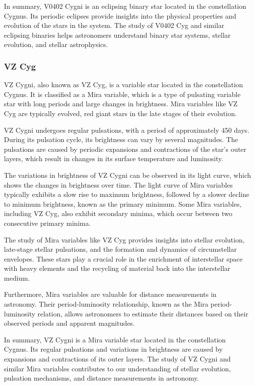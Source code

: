 In summary, V0402 Cygni is an eclipsing binary star located in the constellation Cygnus. Its periodic eclipses provide insights into the physical properties and evolution of the stars in the system. The study of V0402 Cyg and similar eclipsing binaries helps astronomers understand binary star systems, stellar evolution, and stellar astrophysics.

\subsubsection*{ VZ Cyg }
VZ Cygni, also known as VZ Cyg, is a variable star located in the constellation Cygnus. It is classified as a Mira variable, which is a type of pulsating variable star with long periods and large changes in brightness. Mira variables like VZ Cyg are typically evolved, red giant stars in the late stages of their evolution.

VZ Cygni undergoes regular pulsations, with a period of approximately 450 days. During its pulsation cycle, its brightness can vary by several magnitudes. The pulsations are caused by periodic expansions and contractions of the star's outer layers, which result in changes in its surface temperature and luminosity.

The variations in brightness of VZ Cygni can be observed in its light curve, which shows the changes in brightness over time. The light curve of Mira variables typically exhibits a slow rise to maximum brightness, followed by a slower decline to minimum brightness, known as the primary minimum. Some Mira variables, including VZ Cyg, also exhibit secondary minima, which occur between two consecutive primary minima.

The study of Mira variables like VZ Cyg provides insights into stellar evolution, late-stage stellar pulsations, and the formation and dynamics of circumstellar envelopes. These stars play a crucial role in the enrichment of interstellar space with heavy elements and the recycling of material back into the interstellar medium.

Furthermore, Mira variables are valuable for distance measurements in astronomy. Their period-luminosity relationship, known as the Mira period-luminosity relation, allows astronomers to estimate their distances based on their observed periods and apparent magnitudes.

In summary, VZ Cygni is a Mira variable star located in the constellation Cygnus. Its regular pulsations and variations in brightness are caused by expansions and contractions of its outer layers. The study of VZ Cygni and similar Mira variables contributes to our understanding of stellar evolution, pulsation mechanisms, and distance measurements in astronomy.




